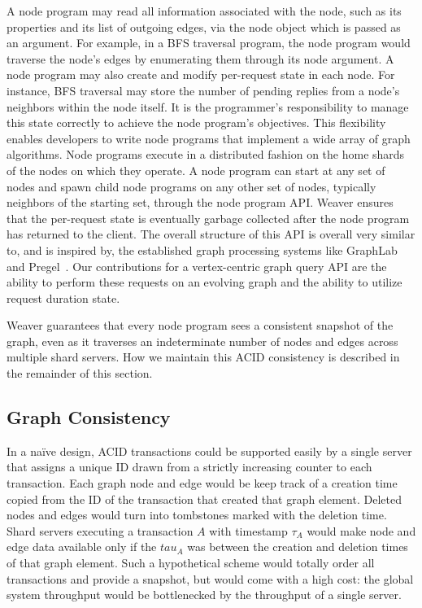 \documentclass[letterpaper,twocolumn,11pt,tight]{article}
\begin{document}
A node program may read all information associated with the node, such as its properties
    and its list of outgoing edges, via the node object which is passed
    as an argument. For example, in a BFS traversal program, the node program would traverse the
    node's edges by enumerating them through its node argument.
A node program may also create and modify per-request state in each node. For instance,
    BFS traversal may store the number of pending replies from a node's neighbors within the
    node itself. It is the programmer's responsibility to manage this state correctly to achieve
    the node program's objectives. This flexibility enables developers to write node programs that 
    implement a wide array of graph algorithms.
Node programs execute in a distributed fashion on the home shards of the nodes on which
    they operate. A node program can start at any set of nodes and spawn child node programs
    on any other set of nodes, typically neighbors of the starting set, through the node 
    program API. 
Weaver ensures that the per-request state is eventually
    garbage collected after the node program has returned to the client.
The overall structure of this API is overall very similar to, and is inspired
by, the established graph processing systems like GraphLab~\cite{powergraph} and
Pregel~\cite{pregel}.
Our contributions for a vertex-centric graph query API are the ability to perform these requests on an evolving graph and the ability to utilize request duration state.


Weaver guarantees that every node program sees a consistent snapshot of the graph, even as it traverses an indeterminate number of nodes and edges across multiple shard servers.
How we maintain this ACID consistency is described in the remainder of this section.

\subsection{Graph Consistency}
In a na\"ive design, ACID transactions could be supported easily by a single server that 
    assigns a unique ID drawn from a strictly increasing counter to each
    transaction. Each graph node and edge would be keep track of a creation time
    copied from the ID of the transaction that created that graph element. Deleted
    nodes and edges would turn into tombstones marked with the deletion time.
    Shard servers executing a transaction $A$ with timestamp $\tau_A$ would 
    make node and edge data available only if the $tau_A$ was between the creation
    and deletion times of that graph element. 
Such a hypothetical scheme would totally order all transactions and provide a snapshot, 
    but would come with a high cost: the global system throughput would be bottlenecked by the
    throughput of a single server.
\end{document}
